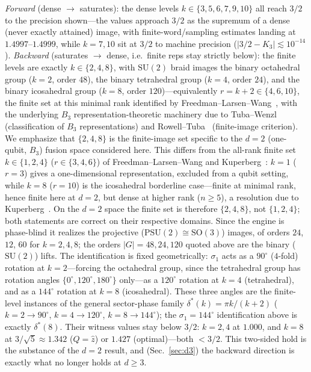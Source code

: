 \documentclass[aps,prx,reprint,amsmath,amssymb,floatfix,nofootinbib,superscriptaddress]{revtex4-2}
\begin{document}
\noindent\emph{Forward} (dense $\to$ saturates): the dense levels
$k \in \{3,5,6,7,9,10\}$ all reach $3/2$ to the precision shown---the values approach
$3/2$ as the supremum of a dense (never exactly attained) image, with
finite-word/sampling estimates landing at $1.4997$--$1.4999$, while $k = 7, 10$ sit at
$3/2$ to machine precision ($|3/2 - K_3| \lesssim 10^{-14}$).
\emph{Backward} (saturates $\to$ dense, i.e.\ finite reps stay strictly below): the
finite levels are exactly $k \in \{2,4,8\}$, with $\mathrm{SU}(2)$ braid images the
binary octahedral group ($k=2$, order $48$), the binary tetrahedral group ($k=4$,
order $24$), and the binary icosahedral group ($k=8$, order $120$)---equivalently
$r = k+2 \in \{4,6,10\}$, the finite set at this minimal rank identified by
Freedman--Larsen--Wang~\cite{FLW}, with the underlying $B_3$
representation-theoretic machinery due to Tuba--Wenzl~\cite{TW} (classification of
$B_3$ representations) and Rowell--Tuba~\cite{RT} (finite-image criterion). We
emphasize that $\{2,4,8\}$
is the finite-image set specific to the $d=2$ (one-qubit, $B_3$) fusion space
considered here. This differs from the all-rank finite set $k \in \{1,2,4\}$
($r \in \{3,4,6\}$) of Freedman--Larsen--Wang and Kuperberg~\cite{FLW,Kup}: $k=1$
($r=3$) gives a one-dimensional representation, excluded from a qubit setting,
while $k=8$ ($r=10$) is the icosahedral borderline case---finite at minimal rank,
hence finite here at $d=2$, but dense at higher rank ($n \ge 5$), a resolution due
to Kuperberg~\cite{Kup}. On the $d=2$ space the finite set is therefore
$\{2,4,8\}$, not $\{1,2,4\}$; both statements are correct on their respective
domains. Since the engine is phase-blind it realizes the projective
($\mathrm{PSU}(2)\cong\mathrm{SO}(3)$) images, of orders $24$, $12$, $60$ for
$k=2,4,8$; the orders $|G|=48,24,120$ quoted above are the binary
($\mathrm{SU}(2)$) lifts. The identification is fixed geometrically: $\sigma_1$
acts as a $90^\circ$ ($4$-fold) rotation at $k=2$---forcing the octahedral group,
since the tetrahedral group has rotation angles $\{0^\circ,120^\circ,180^\circ\}$
only---as a $120^\circ$ rotation at $k=4$ (tetrahedral), and as a $144^\circ$
rotation at $k=8$ (icosahedral). These three angles are the finite-level instances
of the general sector-phase family $\delta^\ast(k) = \pi k/(k+2)$
($k=2\to90^\circ$, $k=4\to120^\circ$, $k=8\to144^\circ$); the $\sigma_1=144^\circ$
identification above is exactly $\delta^\ast(8)$. Their witness values stay below $3/2$: $k=2,4$ at $1.000$, and $k=8$ at
$3/\sqrt5 \approx 1.342$ ($Q=\hat z$) or $1.427$ (optimal)---both $< 3/2$. This
two-sided hold is the substance of the $d=2$ result, and (Sec.~\ref{sec:d3}) the
backward direction is exactly what no longer holds at $d \ge 3$.
\end{document}
